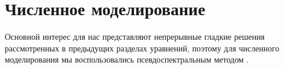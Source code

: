\documentclass[12pt, a4paper]{article}
\begin{document}
\section{Численное моделирование}
Основной интерес для нас представляют непрерывные гладкие решения рассмотренных в предыдущих разделах уравнений, поэтому для численного моделирования мы воспользовались псевдоспектральным методом \cite{Canuto2007}.

\end{document}
